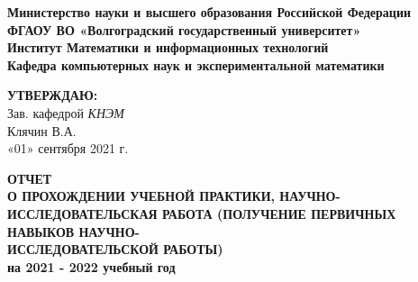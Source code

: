 \documentclass[12pt,a4paper]{scrartcl}
\begin{document}
	\begin{center}
		\textbf{Министерство науки и высшего образования Российской Федерации} \\
		\textbf{ФГАОУ ВО «Волгоградский государственный университет»} \\
		\textbf{Институт Математики и информационных технологий} \\
		\textbf{Кафедра компьютерных наук и экспериментальной математики} \\
		
		\vspace{0.6cm}
		
		\hfill\begin{minipage}{0.4\textwidth}
		\begin{flushright}
			\textbf{\textsc{УТВЕРЖДАЮ:}} \\
			Зав. кафедрой \textit{КНЭМ} \\
			Клячин В.А.\\
			«01» сентября 2021 г.
		\end{flushright}
		\end{minipage}
		
		\vspace{0.6cm}
		
		\textbf{
			ОТЧЕТ\\О ПРОХОЖДЕНИИ УЧЕБНОЙ ПРАКТИКИ, НАУЧНО-ИССЛЕДОВАТЕЛЬСКАЯ РАБОТА (ПОЛУЧЕНИЕ ПЕРВИЧНЫХ НАВЫКОВ НАУЧНО-\\ИССЛЕДОВАТЕЛЬСКОЙ РАБОТЫ)\\на 2021 - 2022 учебный год
			\vspace{0.2cm}
		}
		
		\vspace{0.3cm}
		\renewcommand{\arraystretch}{1.5} %
		

\end{center}
\end{document}
